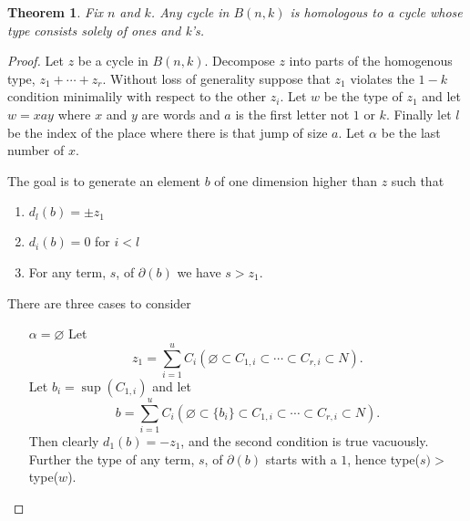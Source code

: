 \documentclass{amsart}
\newtheorem{theorem}{Theorem}
\begin{document}
  \begin{theorem} Fix $n$ and $k$. Any cycle in $B(n, k)$ is homologous to a cycle whose type consists solely of ones and
    k's.
  \end{theorem}
  \begin{proof} Let $z$ be a cycle in $B(n, k)$. Decompose $z$ into parts of the homogenous type, $z_1 + \cdots + z_r$. 
    Without loss of generality suppose that $z_1$ violates the $1-k$ condition minimalily with respect to the other $z_i$.
    Let $w$ be the type of $z_1$ and let $w = xay$ where $x$ and $y$ are words and $a$ is the first letter not 
    $1$ or $k$. Finally let $l$ be the index of the place where there is that jump of size $a$. Let $\alpha$ be the last
    number of $x$.

    The goal is to generate an element $b$ of one dimension higher than $z$ such that 
    \begin{enumerate}
      \item $d_{l} (b) = \pm z_1$
      \item $d_i (b) = 0$ for $i < l$
      \item For any term, $s$,  of $\partial(b)$ we have $s > z_1$.
    \end{enumerate}
    There are three cases to consider   
    \begin{enumerate}
      \item[$\alpha=\varnothing$]
        Let $$z_1 = \sum_{i=1}^u C_i (\varnothing \subset C_{1,i} \subset \cdots \subset C_{r,i} \subset 
        N).$$ Let $b_i =\sup(C_{1,i})$
        and let $$b = \sum_{i=1}^u C_i (\varnothing \subset \{b_i\} \subset C_{1,i} \subset 
        \cdots \subset C_{r,i} \subset N).$$ Then clearly $d_1(b) = -z_1$, and the second condition is true
        vacuously. Further the type of any term, $s$,  of $\partial(b)$ starts with a $1$, hence type($s) >$ type($w$).
   

\end{enumerate}
\end{proof}
\end{document}

